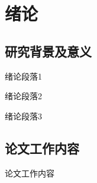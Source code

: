 
\newpage
\section{绪论} %
\subsection{研究背景及意义} %

    绪论段落1

    绪论段落2

    绪论段落3














\subsection{论文工作内容} %

    论文工作内容






